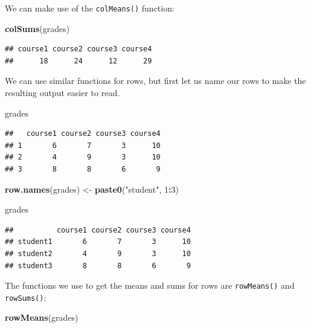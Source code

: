\documentclass[
]{book}
\newenvironment{Shaded}{\begin{snugshade}}{\end{snugshade}}
\newcommand{\DecValTok}[1]{\textcolor[rgb]{0.00,0.00,0.81}{#1}}
\newcommand{\FunctionTok}[1]{\textcolor[rgb]{0.13,0.29,0.53}{\textbf{#1}}}
\newcommand{\NormalTok}[1]{#1}
\newcommand{\OtherTok}[1]{\textcolor[rgb]{0.56,0.35,0.01}{#1}}
\newcommand{\SpecialCharTok}[1]{\textcolor[rgb]{0.81,0.36,0.00}{\textbf{#1}}}
\newcommand{\StringTok}[1]{\textcolor[rgb]{0.31,0.60,0.02}{#1}}
\begin{document}
We can make use of the \texttt{colMeans()} function:

\begin{Shaded}
\begin{Highlighting}[]
\FunctionTok{colSums}\NormalTok{(grades)}
\end{Highlighting}
\end{Shaded}

\begin{verbatim}
## course1 course2 course3 course4 
##      18      24      12      29
\end{verbatim}

We can use similar functions for rows, but first let us name our rows to make the resulting output easier to read.

\begin{Shaded}
\begin{Highlighting}[]
\NormalTok{grades}
\end{Highlighting}
\end{Shaded}

\begin{verbatim}
##   course1 course2 course3 course4
## 1       6       7       3      10
## 2       4       9       3      10
## 3       8       8       6       9
\end{verbatim}

\begin{Shaded}
\begin{Highlighting}[]
\FunctionTok{row.names}\NormalTok{(grades) }\OtherTok{\textless{}{-}} \FunctionTok{paste0}\NormalTok{(}\StringTok{"student"}\NormalTok{, }\DecValTok{1}\SpecialCharTok{:}\DecValTok{3}\NormalTok{)}

\NormalTok{grades}
\end{Highlighting}
\end{Shaded}

\begin{verbatim}
##          course1 course2 course3 course4
## student1       6       7       3      10
## student2       4       9       3      10
## student3       8       8       6       9
\end{verbatim}

The functions we use to get the means and sums for rows are \texttt{rowMeans()} and \texttt{rowSums()}:

\begin{Shaded}
\begin{Highlighting}[]
\FunctionTok{rowMeans}\NormalTok{(grades)}
\end{Highlighting}
\end{Shaded}
\end{document}
